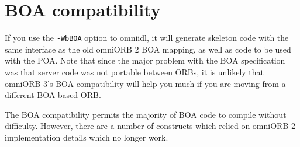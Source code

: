 \documentclass[11pt,twoside,a4paper]{book}
\newcommand{\cmdline}[1]{\texttt{#1}}
\begin{document}
\section{BOA compatibility}
\label{sec:BOAcompat}

If you use the \cmdline{-WbBOA} option to omniidl, it will generate
skeleton code with the same interface as the old omniORB 2 BOA
mapping, as well as code to be used with the POA. Note that since the
major problem with the BOA specification was that server code was not
portable between ORBs, it is unlikely that omniORB 3's BOA
compatibility will help you much if you are moving from a different
BOA-based ORB.

The BOA compatibility permits the majority of BOA code to compile
without difficulty. However, there are a number of constructs which
relied on omniORB 2 implementation details which no longer work.
\end{document}
